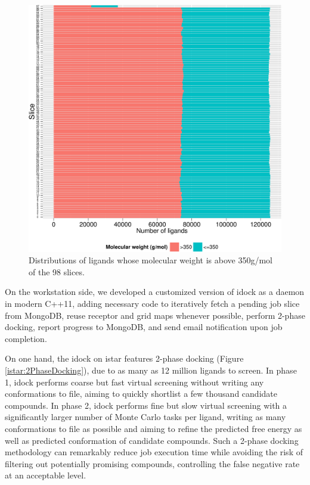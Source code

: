 \begin{figure}
\centering
\includegraphics[width=\linewidth]{istar/gt350.pdf}
\caption{Distributions of ligands whose molecular weight is above 350g/mol of the 98 slices.}
\label{istar:gt350}
\end{figure}

On the workstation side, we developed a customized version of idock as a daemon in modern C++11, adding necessary code to iteratively fetch a pending job slice from MongoDB, reuse receptor and grid maps whenever possible, perform 2-phase docking, report progress to MongoDB, and send email notification upon job completion.

On one hand, the idock on istar features 2-phase docking (Figure \ref{istar:2PhaseDocking}), due to as many as 12 million ligands to screen. In phase 1, idock performs coarse but fast virtual screening without writing any conformations to file, aiming to quickly shortlist a few thousand candidate compounds. In phase 2, idock performs fine but slow virtual screening with a significantly larger number of Monte Carlo tasks per ligand, writing as many conformations to file as possible and aiming to refine the predicted free energy as well as predicted conformation of candidate compounds. Such a 2-phase docking methodology can remarkably reduce job execution time while avoiding the risk of filtering out potentially promising compounds, controlling the false negative rate at an acceptable level.

